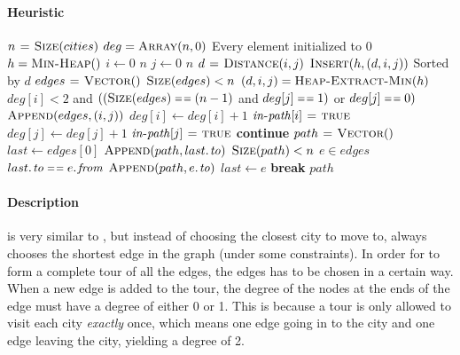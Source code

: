 \paragraph{Heuristic}
\begin{codebox}
\li $n \mathrel{\hspace{1pt}=\hspace{1pt}} \textnormal{\scshape Size}(cities)$
\li $deg = \textnormal{\scshape Array}(n, 0)$ \Comment Every element initialized to 0
\li $h = \textnormal{\scshape Min-Heap}()$
\li \For $i \gets 0$ \To $n$
\li     \Do
            \For $j \gets 0$ \To $n$
\li             \Do
                    $d \mathrel{\hspace{1pt}=\hspace{1pt}} \textnormal{\scshape Distance}(i,j)$
\li                 $\textnormal{\scshape Insert}(h, (d, i, j))$ \Comment Sorted by $d$
                \End
        \End
\li $edges \mathrel{\hspace{1pt}=\hspace{1pt}} \textnormal{\scshape Vector}()$
\li \While $\textnormal{\scshape Size}(edges) < n$ \label{li:greedy:while}
\li     \Do
            $(d, i, j) = \textnormal{\scshape Heap-Extract-Min}(h)$
\li         \If $deg[i] < 2$ and $((\proc{Size}(edges) \isequal (n-1)$ and
                $deg[j] \isequal 1)$ or $deg[j] \isequal 0)$
\li             \Then
                    $\textnormal{\scshape Append}(edges, (i, j))$
\li                 $deg[i] \gets deg[i] + 1$
\li                 $\id{in-path}[i] \gets \const{true}$
\li                 $deg[j] \gets deg[j] + 1$
\li                 $\id{in-path}[j] \gets \const{true}$
\li             \Else \textbf{continue}
                \End
        \End
\li $path \mathrel{\hspace{1pt}=\hspace{1pt}} \textnormal{\scshape Vector}()$
\li $last \gets edges[0]$
\li $\proc{Append}(path, \attrib{last}{to})$
\li \While $\textnormal{\scshape Size}(path) < n$
\li     \Do
            \For $e \in edges$
\li             \Do
                    \If $\attrib{last}{to} \isequal \attrib{e}{from}$
\li                     \Then
                            $\proc{Append}(path, \attrib{e}{to})$
\li                         $last \gets e$
\li                         \textbf{break}
                        \End
                \End
        \End
\li \Return $path$
\end{codebox}
\paragraph{Description}  is very similar to
, but instead of choosing the closest city to move to,
 always chooses the shortest edge in the graph (under some
constraints). In order for  to form a complete tour of all the
edges, the edges has to be chosen in a certain way. When a new edge is added to
the tour, the degree of the nodes at the ends of the edge must have a degree of
either 0 or 1. This is because a tour is only allowed to visit each city
\emph{exactly} once, which means one edge going in to the city and one edge
leaving the city, yielding a degree of 2.

